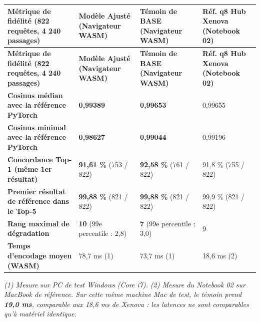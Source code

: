\documentclass[11pt,a4paper]{article}
\newcommand{\thead}[1]{{\tabfont\bfseries\color{accent}\hspace{0pt}#1}}
\newenvironment{tabletype}
  {\par\addvspace{7pt}\begingroup
   \tabfont\setlength{\tabcolsep}{4pt}\renewcommand{\arraystretch}{1.26}
   \setlength{\LTleft}{0pt}\setlength{\LTright}{0pt}
   \setlength{\extrarowheight}{1pt}
   \hyphenpenalty=9000\exhyphenpenalty=9000
   \emergencystretch=0pt\hbadness=10000\relax}
  {\endgroup\par\addvspace{9pt}}
\newlength{\tw}\setlength{\tw}{\textwidth}
\newcommand{\settw}[1]{\setlength{\tw}{\dimexpr\textwidth-#1pt\relax}}
\begin{document}
\begin{tabletype}
\small
\settw{24.0}
\setlength{\LTpre}{0pt}\setlength{\LTpost}{0pt}
\begin{longtable}{@{}L{0.37657\tw}L{0.20843\tw}L{0.21332\tw}L{0.20168\tw}@{}}
\toprule
\thead{Métrique de fidélité (822 requêtes, 4 240 passages)} & \thead{Modèle Ajusté (Navigateur WASM)} & \thead{Témoin de BASE (Navigateur WASM)} & \thead{Réf. q8 Hub Xenova (Notebook 02)} \\
\midrule
\endfirsthead
\toprule
\thead{Métrique de fidélité (822 requêtes, 4 240 passages)} & \thead{Modèle Ajusté (Navigateur WASM)} & \thead{Témoin de BASE (Navigateur WASM)} & \thead{Réf. q8 Hub Xenova (Notebook 02)} \\
\midrule
\endhead
\bottomrule
\endfoot
\bottomrule
\endlastfoot
\textbf{Cosinus médian avec la référence PyTorch} & \textbf{0,99389} & \textbf{0,99653} & 0,99655 \\
\textbf{Cosinus minimal avec la référence PyTorch} & \textbf{0,98627} & \textbf{0,99044} & 0,99196 \\
\textbf{Concordance Top-1 (même 1er résultat)} & \textbf{91,61 \%} (753 / 822) & \textbf{92,58 \%} (761 / 822) & 91,8 \% (755 / 822) \\
\textbf{Premier résultat de référence dans le Top-5} & \textbf{99,88 \%} (821 / 822) & \textbf{99,88 \%} (821 / 822) & 99,9 \% (821 / 822) \\
\textbf{Rang maximal de dégradation} & \textbf{10} (99e percentile : 2,8) & \textbf{7} (99e percentile : 3,0) & 9 \\
\textbf{Temps d'encodage moyen (WASM)} & 78,7 ms (1) & 73,7 ms (1) & 18,6 ms (2) \\
\end{longtable}
\end{tabletype}

\vspace{2pt}\noindent\textit{\footnotesize (1) Mesure sur PC de test Windows (Core i7). (2) Mesure du Notebook 02 sur MacBook de référence. Sur cette même machine Mac de test, le témoin prend \textbf{19,0 ms}, comparable aux 18,6 ms de Xenova : les latences ne sont comparables qu'à matériel identique.}\par\vspace{4pt}
\end{document}

